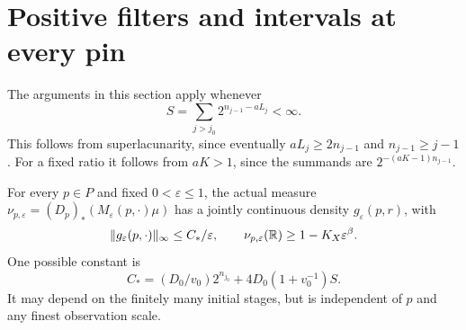 \section{Positive filters and intervals at every pin}\label{sec:filters}
The arguments in this section apply whenever
\begin{equation}\label{eq:S}
 S=\sum_{j>j_0}2^{n_{j-1}-aL_j}<\infty.
\end{equation}
This follows from superlacunarity, since eventually $aL_j\geq2n_{j-1}$
and $n_{j-1}\geq j-1$. For a fixed ratio it follows from $aK>1$, since
the summands are $2^{-(aK-1)n_{j-1}}$.

\begin{proposition}\label{prop:fixed-filter}
For every $p\in P$ and fixed $0<\varepsilon\leq1$, the actual measure
$\nu_{p,\varepsilon}=(D_p)_*(M_\varepsilon(p,\cdot)\mu)$ has a
jointly continuous density $g_\varepsilon(p,r)$, with
\begin{equation}\label{eq:fixed-good-bound}
 \lVert g_\varepsilon(p,\cdot)\rVert_\infty\leq C_*/\varepsilon,
 \qquad \nu_{p,\varepsilon}(\mathbb R)\geq1-K_X\varepsilon^\beta.
\end{equation}
One possible constant is
\begin{equation}\label{eq:Cstar}
 C_*=(D_0/v_0)2^{n_{j_0}}+4D_0(1+v_0^{-1})S.
\end{equation}
It may depend on the finitely many initial stages, but is independent of
$p$ and any finest observation scale.
\end{proposition}
